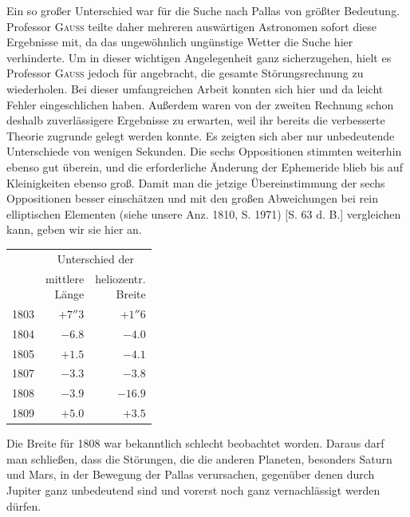 \par\indent Ein so großer Unterschied war für die Suche nach Pallas von größter Bedeutung. Professor \textsc{Gauss} teilte daher mehreren auswärtigen Astronomen sofort diese Ergebnisse mit, da das ungewöhnlich ungünstige Wetter die Suche hier verhinderte. Um in dieser wichtigen Angelegenheit ganz sicherzugehen, hielt es Professor \textsc{Gauss} jedoch für angebracht, die gesamte Störungsrechnung zu wiederholen. Bei dieser umfangreichen Arbeit konnten sich hier und da leicht Fehler eingeschlichen haben. Außerdem waren von der zweiten Rechnung schon deshalb zuverlässigere Ergebnisse zu erwarten, weil ihr bereits die verbesserte Theorie zugrunde gelegt werden konnte. Es zeigten sich aber nur unbedeutende Unterschiede von wenigen Sekunden. Die sechs Oppositionen stimmten weiterhin ebenso gut überein, und die erforderliche Änderung der Ephemeride blieb bis auf Kleinigkeiten ebenso groß. Damit man die jetzige Übereinstimmung der sechs Oppositionen besser einschätzen und mit den großen Abweichungen bei rein elliptischen Elementen (siehe unsere Anz. 1810, S. 1971) [S. 63 d. B.] vergleichen kann, geben wir sie hier an.
\begin{center}\fontsize{10}{12}\selectfont\setlength{\tabcolsep}{4pt}\renewcommand{\arraystretch}{1.15}\begin{tabular}{r|r|r}
 & \multicolumn{2}{c}{Unterschied der}\\
 & \shortstack{mittlere\\Länge} & \shortstack{heliozentr.\\Breite}\\\hline
1803 & $+7''3$ & $+1''6$\\
1804 & $-6.8$ & $-4.0$\\
1805 & $+1.5$ & $-4.1$\\
1807 & $-3.3$ & $-3.8$\\
1808 & $-3.9$ & $-16.9$\\
1809 & $+5.0$ & $+3.5$\\
\end{tabular}\end{center}

\par\indent Die Breite für 1808 war bekanntlich schlecht beobachtet worden. Daraus darf man schließen, dass die Störungen, die die anderen Planeten, besonders Saturn und Mars, in der Bewegung der Pallas verursachen, gegenüber denen durch Jupiter ganz unbedeutend sind und vorerst noch ganz vernachlässigt werden dürfen.

